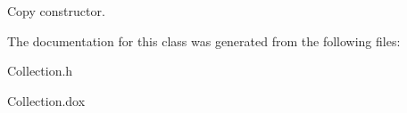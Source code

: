 Copy constructor. 

The documentation for this class was generated from the following files\-:\begin{DoxyCompactItemize}
\item 
Collection.\-h\item 
Collection.\-dox\end{DoxyCompactItemize}
